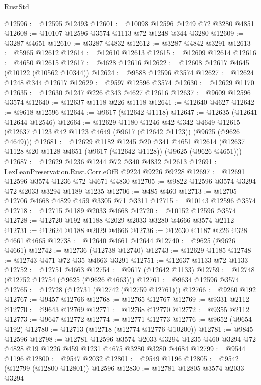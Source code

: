 \begin{lexlean}{RustStd}
\begin{coremodule}
{\begin{coremodule}
{{{{{{{{{{{{{{{{{{{{{{{{{{{{{{{{{@12596 := @12595 @12493
@12601 := @10098 @12596 @1249 @72 @3280 @4851
@12608 := @10107 @12596 @3574 @1113 @72 @1248 @344 @3280
@12609 := @3287 @4651
@12610 := @3287 @4832
@12612 := @3287 @4842 @3291
@12613 := @5965 @12612
@12614 := @12610 @12613
@12615 := @12609 @12614
@12616 := @4650 @12615
@12617 := @4628 @12616
@12622 := @12608 @12617 @4645 (@10122 (@10562 @10344))
@12624 := @9588 @12596 @3574
@12627 := @12624 @1248 @344 @12617
@12629 := @9597 @12596 @3574
@12630 := @12629 @1170
@12635 := @12630 @1247 @226 @343 @4627 @12616
@12637 := @9609 @12596 @3574
@12640 := @12637 @1118 @226 @1118
@12641 := @12640 @4627
@12642 := @9618 @12596
@12644 := @9617 (@12642 @1118)
@12647 := @12635 (@12641 @12644 @12546)
@12664 := @12629
    @1180
    @1246
    @42
    @342
    @4649
    @12615
    (@12637 @1123 @42 @1123 @4649 (@9617 (@12642 @1123)) (@9625 (@9626 @4649)))
@12681 := @12629
    @1182
    @1245
    @20
    @341
    @4651
    @12614
    (@12637 @1128 @20 @1128 @4651 (@9617 (@12642 @1128)) (@9625 (@9626 @4651)))
@12687 := @12629 @1236 @1244 @72 @340 @4832 @12613
@12691 := LexLeanPreservation.Rust.Corr.eOfB @9224 @9226 @9228
@12697 := @12691 @12596 @3574 @1236 @72 @4671 @4830
@12705 := @9822 @12596 @3574 @3294 @72 @2033 @3294 @1189 @1235
@12706 := @485 @460
@12713 := @12705 @12706 @4668 @4829 @459 @3305 @71 @3311
@12715 := @10143 @12596 @3574
@12718 := @12715 @1189 @2033 @4668
@12720 := @10152 @12596 @3574
@12728 := @12720 @192 @1188 @2029 @2033 @3280 @4666 @3574 @2112
@12731 := @12624 @1188 @2029 @4666
@12736 := @12630 @1187 @226 @328 @4661 @4665
@12738 := @12640 @4661 @12644
@12740 := @9625 (@9626 @4661)
@12742 := @12736 (@12738 @12740)
@12743 := @12629 @1185
@12748 := @12743 @471 @72 @35 @4663 @3291
@12751 := @12637 @1133 @72 @1133
@12752 := @12751 @4663
@12754 := @9617 (@12642 @1133)
@12759 := @12748 (@12752 @12754 (@9625 (@9626 @4663)))
@12761 := @9634 @12596 @3574
@12765 := @12728 (@12731 (@12742 (@12759 @12761)))
@12766 := @9260 @192
@12767 := @9457 @12766
@12768 := @12765 @12767
@12769 := @9331 @2112
@12770 := @9643 @12769
@12771 := @12768 @12770
@12772 := @9355 @2112
@12773 := @9647 @12772
@12774 := @12771 @12773
@12776 := @9652 (@9654 @192)
@12780 := @12713 (@12718 (@12774 @12776 @10200))
@12781 := @9845 @12596
@12798 := @12781
    @12596
    @3574
    @2033
    @3294
    @1235
    @460
    @3294
    @72
    @4828
    @19
    @1226
    @459
    @1231
    @4675
    @3280
    @3280
    @4684
@12799 := @9544 @1196
@12800 := @9547 @2032
@12801 := @9549 @1196
@12805 := @9542 (@12799 (@12800 @12801)) @12596
@12830 := @12781
    @12805
    @3574
    @2033
    @3294
}}}}}}}}}}}}}}}}}}}}}}}}}}}}}}}}}
\end{coremodule}}
\end{coremodule}
\end{lexlean}
